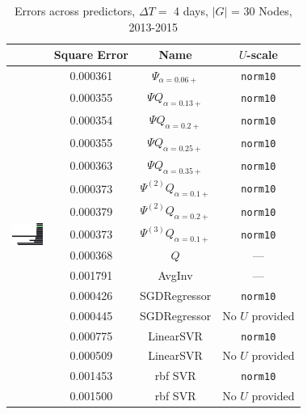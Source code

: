 \documentclass{article}
\theoremstyle{definition}
\begin{document}
\begin{table}
		\begin{tabular}{cccc}
			& Square Error & Name & $U$-scale \\\hline
			\multirow{16}{*}{\includegraphics[width=1cm,height=19em]{figs/bar}}
			& 0.000361 & $\Psi_{\alpha=0.06+}$ &\texttt{norm10} \\
			&0.000355 & $\Psi Q_{\alpha=0.13+}$ & \texttt{norm10} \\
			&0.000354 & $\Psi Q_{\alpha=0.2+}$ & \texttt{norm10} \\
			&0.000355 & $\Psi Q_{\alpha=0.25+}$ & \texttt{norm10} \\
			&0.000363 & $\Psi Q_{\alpha=0.35+}$ & \texttt{norm10} \\
			&0.000373 & $\Psi^{(2)} Q_{\alpha=0.1+}$ & \texttt{norm10} \\
			&0.000379 & $\Psi^{(2)} Q_{\alpha=0.2+}$ & \texttt{norm10} \\
			&0.000373 & $\Psi^{(3)} Q_{\alpha=0.1+}$ & \texttt{norm10} \\
			&0.000368 & $Q$ & --- \\
			&0.001791 & AvgInv & --- \\
			&0.000426 & SGDRegressor & \texttt{norm10} \\
			&0.000445 & SGDRegressor & No $U$ provided \\
			&0.000775 & LinearSVR & \texttt{norm10} \\
			&0.000509 & LinearSVR & No $U$ provided \\
			&0.001453 & rbf SVR & \texttt{norm10} \\
			&0.001500 & rbf SVR & No $U$ provided \\
		\end{tabular}
		\caption{\color{darkgray} Errors across predictors, $\Delta T = $ 4 days, $|G|$ = 30 Nodes, 2013-2015}\label{tab:full}
	\end{table}
\end{document}

